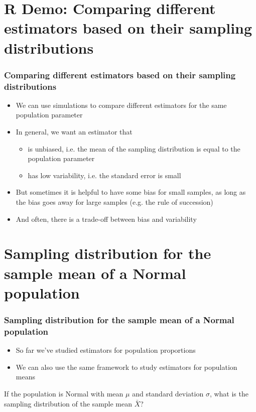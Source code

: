 \documentclass[t,compress,mathserif]{beamer}
\begin{document}

\section{R Demo: Comparing different estimators based on their sampling distributions}

\begin{frame}
    \frametitle{Comparing different estimators based on their sampling distributions}

    \begin{itemize}
        \item We can use simulations to compare different estimators for the same population parameter
        \item In general, we want an estimator that
        \begin{itemize}
            \item is unbiased, i.e. the mean of the sampling distribution is equal to the population parameter
            \item has low variability, i.e. the standard error is small
        \end{itemize}
        \item But sometimes it is helpful to have some bias for small samples, as long as the bias goes away for large samples (e.g. the rule of succession)
        \item And often, there is a trade-off between bias and variability
    \end{itemize}
\end{frame}


\section{Sampling distribution for the sample mean of a Normal population}

\begin{frame}
\frametitle{Sampling distribution for the sample mean of a Normal population}
\begin{itemize}
    \item So far we've studied estimators for population proportions
    \item We can also use the same framework to study estimators for population means
\end{itemize}
If the population is Normal with mean $\mu$ and standard deviation $\sigma$, what is the sampling distribution of the sample mean $\bar{X}$?
\end{frame}
\end{document}
